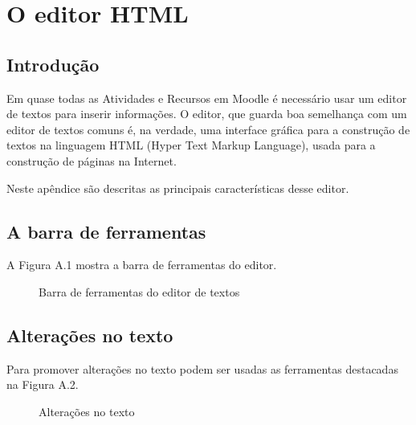 \chapter{O editor HTML}


\section{Introdução}

Em quase todas as Atividades e Recursos em Moodle é necessário usar um editor de textos para inserir informações. O editor, que guarda boa semelhança com um editor de textos comuns é, na verdade, uma interface gráfica para a construção de textos na linguagem HTML (Hyper Text Markup Language), usada para a construção de páginas na Internet.

Neste apêndice são descritas as principais características desse editor.

\section{A barra de ferramentas}


A Figura A.1 mostra a barra de ferramentas do editor.

\begin{figure}
 \begin{center}
  \caption{Barra de ferramentas do editor de textos}
 \end{center}
\end{figure}

\section{Alterações no texto}


Para promover alterações no texto podem ser usadas as ferramentas destacadas na Figura A.2.

\begin{figure}
 \begin{center}
  \caption{Alterações no texto}
 \end{center}
\end{figure}

